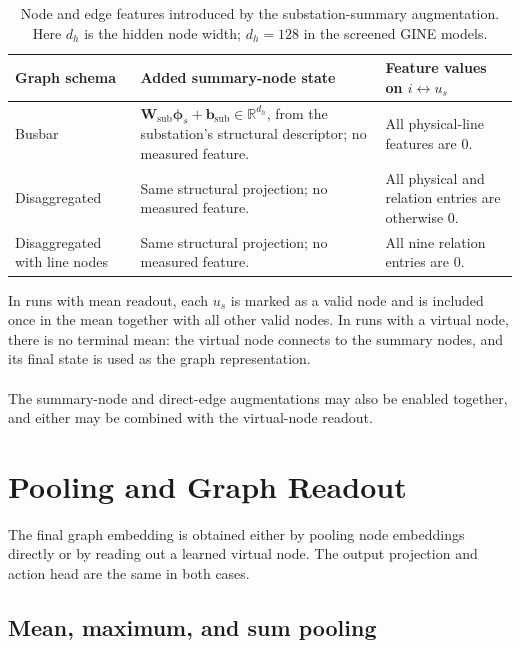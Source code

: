 \begin{table}[H]
  \centering
  \small
  \caption{Node and edge features introduced by the substation-summary
  augmentation. Here $d_h$ is the hidden node width; $d_h=128$ in the screened
  GINE models.}
  \label{tab:summary-node-augmentation-features}
  \setlength{\tabcolsep}{4pt}
  \begin{tabular}{L{0.20\textwidth}L{0.31\textwidth}L{0.39\textwidth}}
    \toprule
    Graph schema & Added summary-node state & Feature values on $i\leftrightarrow u_s$ \\
    \midrule
    Busbar & $\mathbf W_{\mathrm{sub}}\boldsymbol\phi_s+\mathbf b_{\mathrm{sub}}\in\mathbb{R}^{d_h}$, from the substation's structural descriptor; no measured feature. & All physical-line features are $0$. \\
    Disaggregated & Same structural projection; no measured feature. & All physical and relation entries are otherwise $0$. \\
    Disaggregated with line nodes & Same structural projection; no measured feature. & All nine relation entries are $0$. \\
    \bottomrule
  \end{tabular}
\end{table}

\noindent In runs with mean readout, each $u_s$ is marked as a valid node and is
included once in the mean together with all other valid nodes. In runs with a virtual
node, there is no terminal mean: the virtual node connects to the summary nodes,
and its final state is used as the graph representation.
\\
\\
The summary-node and direct-edge augmentations may also be enabled together,
and either may be combined with the virtual-node readout.


\section{Pooling and Graph Readout}
\label{sec:graph-pooling}

The final graph embedding is obtained either by pooling node embeddings directly
or by reading out a learned virtual node. The output projection and action head
are the same in both cases.

\subsection{Mean, maximum, and sum pooling}
\label{subsec:graph-mean-pooling}

